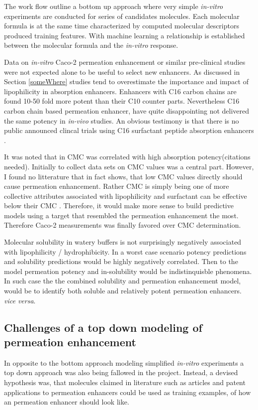 The work flow outline a bottom up approach where very simple \textit{in-vitro} experiments are conducted for series of candidates molecules. Each molecular formula is at the same time characterized by computed molecular descriptors  produced training features. With machine learning a relationship is established between the molecular formula and the \textit{in-vitro} response.

Data on \textit{in-vitro} Caco-2 permeation enhancement or similar pre-clinical studies were not expected alone to be useful to select new enhancers. As discussed in Section \ref{someWhere}  studies tend to overestimate the importance and impact of lipophilicity in absorption enhancers. Enhancers with C16 carbon chains are found 10-50 fold more potent than their C10 counter parts. Nevertheless C16 carbon chain based permeation enhancer, have quite disappointing not delivered the same potency in \textit{in-vivo} studies. An obvious testimony is that there is no public announced clincal trials using C16 surfactant peptide absorption enhancers \cite{aguirre2016current}.

It was noted that in CMC was correlated with high absorption potency(citations needed). Initially to collect data sets on CMC values was a central part. However,  I found no litterature that in fact shows, that low CMC values directly should cause permeation enhancement. Rather CMC is simply being one of more collective attributes associated with lipophilicity \cite{rosen2012surfactants} and surfactant can be effective below their CMC \cite{xia2000mechanistic}. Therefore, it would make more sense to build predictive models using a target that resembled the permeation enhancement the most. Therefore Caco-2 measurements was finally favored over CMC determination.

Molecular solubility in watery buffers is not surprisingly negatively associated with lipophilicity / hydrophibicity. In a worst case scenario potency predictions and solubility predictions would be highly negatively correlated. Then to the model permeation potency and in-solubility would be indistinquisble phenomena. In such case the the combined solubility and permeation enhancement model, would be to identify both soluble and relatively potent permeation enhancers. \textit{vice versa}.

\subsection{Challenges of a top down modeling of permeation enhancement}
In opposite to the bottom approach modeling simplified \textit{in-vitro} experiments a top down approach was also being fallowed in the project. Instead,
a devised hypothesis was, that molecules claimed in literature such as articles and patent applications to permeation enhancers could be used as training examples, of how an permeation enhancer should look like.

